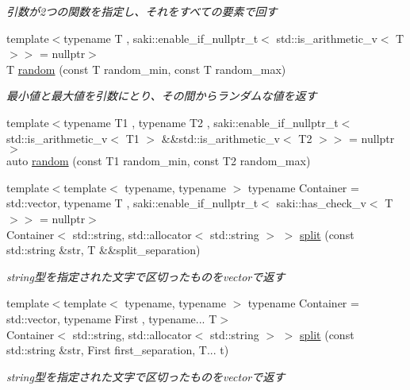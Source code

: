 \begin{DoxyCompactItemize}
\begin{DoxyCompactList}\small\item\em 引数が2つの関数を指定し、それをすべての要素で回す \end{DoxyCompactList}\item 
{\footnotesize template$<$typename T , saki\+::enable\+\_\+if\+\_\+nullptr\+\_\+t$<$ std\+::is\+\_\+arithmetic\+\_\+v$<$ T $>$$>$  = nullptr$>$ }\\T \mbox{\hyperlink{namespacesaki_adec39fdef417fa75fb6a6bd06b08490c}{random}} (const T random\+\_\+min, const T random\+\_\+max)
\begin{DoxyCompactList}\small\item\em 最小値と最大値を引数にとり、その間からランダムな値を返す \end{DoxyCompactList}\item 
{\footnotesize template$<$typename T1 , typename T2 , saki\+::enable\+\_\+if\+\_\+nullptr\+\_\+t$<$ std\+::is\+\_\+arithmetic\+\_\+v$<$ T1 $>$ \&\&std\+::is\+\_\+arithmetic\+\_\+v$<$ T2 $>$$>$  = nullptr$>$ }\\auto \mbox{\hyperlink{namespacesaki_a8a3d0c8d244f1f8e5c6c8310f7e7b647}{random}} (const T1 random\+\_\+min, const T2 random\+\_\+max)
\item 
{\footnotesize template$<$template$<$ typename, typename $>$ typename Container = std\+::vector, typename T , saki\+::enable\+\_\+if\+\_\+nullptr\+\_\+t$<$ saki\+::has\+\_\+check\+\_\+v$<$ T $>$$>$  = nullptr$>$ }\\Container$<$ std\+::string, std\+::allocator$<$ std\+::string $>$ $>$ \mbox{\hyperlink{namespacesaki_ad15185db28f6e77d65411ca83f64f5bb}{split}} (const std\+::string \&str, T \&\&split\+\_\+separation)
\begin{DoxyCompactList}\small\item\em string型を指定された文字で区切ったものをvectorで返す \end{DoxyCompactList}\item 
{\footnotesize template$<$template$<$ typename, typename $>$ typename Container = std\+::vector, typename First , typename... T$>$ }\\Container$<$ std\+::string, std\+::allocator$<$ std\+::string $>$ $>$ \mbox{\hyperlink{namespacesaki_a937a85e91730e4bb6fb84a9f1027d205}{split}} (const std\+::string \&str, First first\+\_\+separation, T... t)
\begin{DoxyCompactList}\small\item\em string型を指定された文字で区切ったものをvectorで返す \end{DoxyCompactList}\item 

\end{DoxyCompactItemize}
